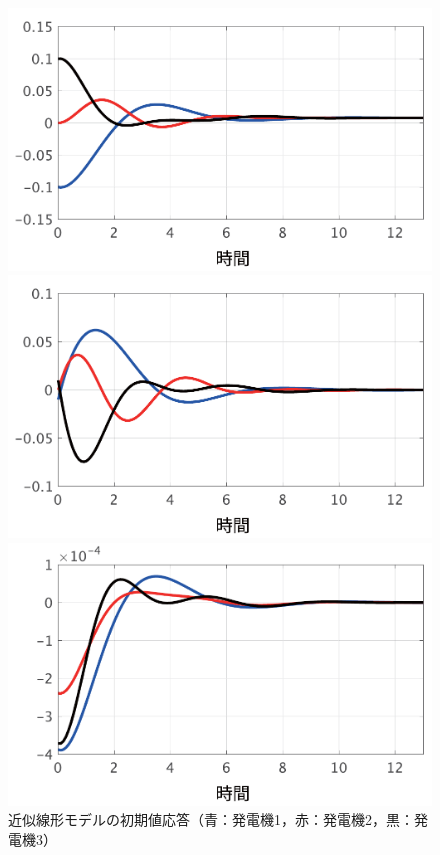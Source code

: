 \documentclass[tombow,dvipdfmx]{corona-a5}
\begin{document}
\begin{figure}[t]
  \centering
  {
  \begin{minipage}{0.32\linewidth}
    \centering
    \includegraphics[width = .99\linewidth]{figs/delta}
  \end{minipage}
  \begin{minipage}{0.32\linewidth}
    \centering
    \includegraphics[width = .99\linewidth]{figs/omega}
  \end{minipage}
  \begin{minipage}{0.32\linewidth}
    \centering
    \includegraphics[width = .99\linewidth]{figs/E}
  \end{minipage}
  }
  \caption{近似線形モデルの初期値応答（青：発電機1，赤：発電機2，黒：発電機3）}
  \label{fig:timeex}
\end{figure}
\end{document}
